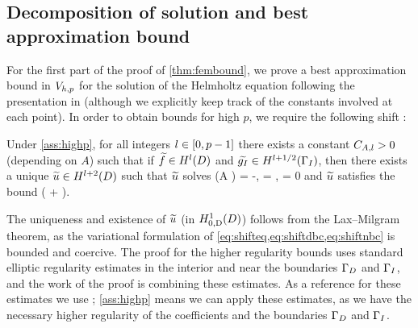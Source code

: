 \subsection{Decomposition of solution and best approximation bound}\label{sec:decomp}

For the first part of the proof of \cref{thm:fembound}, we prove a best approximation bound in $V_{h,p}$ for the solution of the Helmholtz equation following the presentation in \cite{ChNi:19} (although we explicitly keep track of the constants involved at each point). In order to obtain bounds for high $p$, we require the following shift :

\label{thm:shift}
Under \cref{ass:highp}, for all integers $l \in \mleft[0,p-1\mright]$ there exists a constant $C_{A,l}>0$ (depending on $A$) such that if $\ftilde \in \HlD$ and $\gItilde \in \HlphGI$, then there exists a unique $\utilde \in \HlptD$ such that $\widetilde{u}$ solves
\beq\label{eq:shifteq}
\grad \cdot \mleft(A \grad \utilde\mright) = -\ftilde,
\eeq
\beq\label{eq:shiftdbc}
\dn \utilde = \gItilde, \tand
\eeq
\beq\label{eq:shiftnbc}
\trD \utilde = 0
\eeq
and $\widetilde{u}$ satisfies the bound
\beq\label{eq:shift}
\NHlptD{\utilde} \leq \CAl \mleft(\NHlD{\ftilde} + \NHlphGI{\gItilde}\mright).
\eeq
\enth

The uniqueness and existence of $\widetilde{u}$ (in $\HozDD$) follows from the Lax--Milgram theorem, as the variational formulation of \cref{eq:shifteq,eq:shiftdbc,eq:shiftnbc} is bounded and coercive. The proof for the higher regularity bounds uses standard elliptic regularity estimates in the interior and near the boundaries $\Gamma_{D}$ and $\Gamma_{I}$, and the work of the proof is combining these estimates. As a reference for these estimates we use \cite[pp. 137-138]{Mc:00}; \cref{ass:highp} means we can apply these estimates, as we have the necessary higher regularity of the coefficients and the boundaries $\Gamma_{D}$ and $\Gamma_{I}$.

